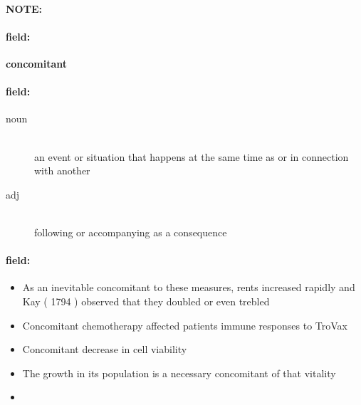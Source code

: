 \documentclass[12pt]{article}
\newenvironment{note}{\paragraph{NOTE:}}{}
\newenvironment{field}{\paragraph{field:}}{}
\begin{document}
\begin{note}
\begin{field}
\textbf{\large concomitant}
\end{field}


\begin{field}
\begin{description}
\item[noun] \hfill \\ 
an event or situation that happens at the same time as or in connection with another

\item[adj] \hfill \\ 
following or accompanying as a consequence

\end{description}
\end{field}

\begin{field}
\begin{itemize}
\item As an inevitable concomitant to these measures, rents increased rapidly and Kay ( 1794 ) observed that they doubled or even trebled
\item Concomitant chemotherapy affected patients immune responses to TroVax
\item Concomitant decrease in cell viability
\item The growth in its population is a necessary concomitant of that vitality
\item 
\end{itemize}
\end{field}
\end{note}
\end{document}
